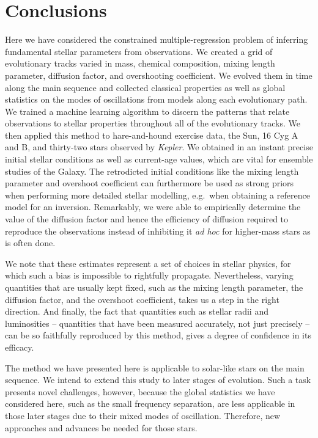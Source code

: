 \documentclass[manuscript]{aastex}
\begin{document}
\section{Conclusions}
Here we have considered the constrained multiple-regression problem of inferring fundamental stellar parameters from observations. We created a grid of evolutionary tracks varied in mass, chemical composition, mixing length parameter, diffusion factor, and overshooting coefficient. We evolved them in time along the main sequence and collected classical properties as well as global statistics on the modes of oscillations from models along each evolutionary path. We trained a machine learning algorithm to discern the patterns that relate observations to stellar properties throughout all of the evolutionary tracks. We then applied this method to hare-and-hound exercise data, the Sun, 16 Cyg A and B, and thirty-two stars observed by \emph{Kepler}. We obtained in an instant precise initial stellar conditions as well as current-age values, which are vital for ensemble studies of the Galaxy. The retrodicted initial conditions like the mixing length parameter and overshoot coefficient can furthermore be used as strong priors when performing more detailed stellar modelling, e.g.~when obtaining a reference model for an inversion. Remarkably, we were able to empirically determine the value of the diffusion factor and hence the efficiency of diffusion required to reproduce the observations instead of inhibiting it \emph{ad hoc} for higher-mass stars as is often done. 

We note that these estimates represent a set of choices in stellar physics, for which such a bias is impossible to rightfully propagate. Nevertheless, varying quantities that are usually kept fixed, such as the mixing length parameter, the diffusion factor, and the overshoot coefficient, takes us a step in the right direction. And finally, the fact that quantities such as stellar radii and luminosities -- quantities that have been measured accurately, not just precisely -- can be so faithfully reproduced by this method, gives a degree of confidence in its efficacy. 

The method we have presented here is applicable to solar-like stars on the main sequence. We intend to extend this study to later stages of evolution. Such a task presents novel challenges, however, because the global statistics we have considered here, such as the small frequency separation, are less applicable in those later stages due to their mixed modes of oscillation. Therefore, new approaches and advances be needed for those stars. 
\end{document}
